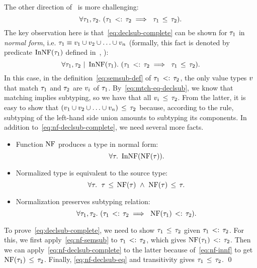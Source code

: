 The other direction of~ is more challenging: 
\begin{equation}\label{eq:declsub-complete}
\forall \ty_1, \ty_2.\ 
(\bjsemsub{\ty_1}{\ty_2} \implies\ \bjsub{\ty_1}{\ty_2}).
\end{equation}
The key observation here is that~\eqref{eq:declsub-complete} can be shown 
for $\tau_1$ in \emph{normal form},
i.e. $\tau_1 \equiv v_1 \cup v_2 \cup \ldots \cup v_n$
(formally, this fact is denoted by predicate $\mathop{\mathrm{InNF}}(\tau_1)$ 
defined in~, ):
\begin{equation}\label{eq:nf-declsub-complete}
\forall \tau_1, \tau_2 ~\vert~ \mathop{\mathrm{InNF}}(\tau_1).\
(\tau_1 \, <: \, \tau_2 \implies\ \tau_1 \, \leq \, \tau_2).
\end{equation}
In this case, in the definition~\eqref{eq:semsub-def}
of $\tau_1 \, <: \, \tau_2$, the only
value types $v$ that match $\tau_1$ and $\tau_2$ are $v_i$ of $\tau_1$. 
By~\eqref{eq:mtch-eq-declsub}, we know that matching implies subtyping,
so we have that all $v_i \, \leq \, \tau_2$.
From the latter, it is easy to show that 
$(v_1 \cup v_2 \cup \ldots \cup v_n) \, \leq \, \tau_2$ because,
according to the \RD{UnionL} rule,
subtyping of the left-hand side union amounts to subtyping its components.
In addition to~\eqref{eq:nf-declsub-complete}, we need several more facts.
\begin{itemize}
  \item Function $\mathop{\mathrm{NF}}$ produces a type in normal form:
	\begin{equation}\label{eq:nf-innf}
	\forall \tau.\ \mathop{\mathrm{InNF}}(\mathop{\mathrm{NF}}(\tau)).
	\end{equation}
  \item Normalized type is equivalent to the source type:
    \begin{equation}\label{eq:nf-declsub-eq}
    \forall \ty.\;\ \bjsub{\ty}{\NF(\ty)}\ \land\ \bjsub{\NF(\ty)}{\ty}.
    \end{equation}
  \item Normalization preserves subtyping relation:
    \begin{equation}\label{eq:nf-semsub}
    \forall \ty_1, \ty_2.\ 
    (\bjsemsub{\ty_1}{\ty_2} \implies\ \bjsemsub{\NF(\ty_1)}{\ty_2}).
    \end{equation}
\end{itemize}
To prove~\eqref{eq:declsub-complete}, we need to show $\tau_1 \, \leq \, \tau_2$
given $\tau_1 \, <: \, \tau_2$. 
For this, we first apply~\eqref{eq:nf-semsub} to $\tau_1 \, <: \, \tau_2$,
which gives $\mathop{\mathrm{NF}}(\tau_1) \, <: \, \tau_2$. 
Then we can apply~\eqref{eq:nf-declsub-complete} to the latter
because of~\eqref{eq:nf-innf} to get $\mathop{\mathrm{NF}}(\tau_1) \, \leq \, \tau_2$.
Finally, \eqref{eq:nf-declsub-eq} and transitivity 
gives $\tau_1 \, \leq \, \tau_2$. \qed

